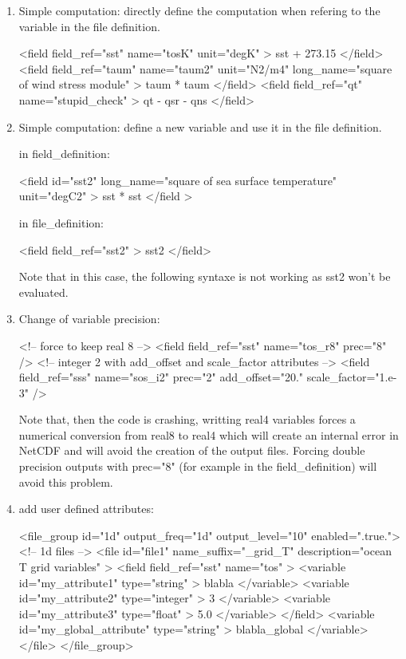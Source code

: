 \documentclass[../main/NEMO_manual]{subfiles}
\begin{document}
\begin{enumerate}
\item Simple computation: directly define the computation when refering to the variable in the file definition.

\begin{xmllines}
<field field_ref="sst"  name="tosK"  unit="degK" > sst + 273.15 </field>
<field field_ref="taum" name="taum2" unit="N2/m4" long_name="square of wind stress module" >   taum * taum </field>
<field field_ref="qt"   name="stupid_check" > qt - qsr - qns </field>
\end{xmllines}

\item Simple computation: define a new variable and use it in the file definition.

in field\_definition:

\begin{xmllines}
<field id="sst2" long_name="square of sea surface temperature" unit="degC2" >  sst * sst </field >
\end{xmllines}

in file\_definition:

\begin{xmllines}
<field field_ref="sst2" > sst2 </field>
\end{xmllines}

Note that in this case, the following syntaxe  is not working as
sst2 won't be evaluated.

\item Change of variable precision:

\begin{xmllines}
<!-- force to keep real 8 -->
<field field_ref="sst" name="tos_r8" prec="8" />
<!-- integer 2  with add_offset and scale_factor attributes -->
<field field_ref="sss" name="sos_i2" prec="2" add_offset="20." scale_factor="1.e-3" />
\end{xmllines}

Note that, then the code is crashing, writting real4 variables forces a numerical conversion from
real8 to real4 which will create an internal error in NetCDF and will avoid the creation of the output files.
Forcing double precision outputs with prec="8" (for example in the field\_definition) will avoid this problem.

\item add user defined attributes:

\begin{xmllines}
<file_group id="1d" output_freq="1d" output_level="10" enabled=".true."> <!-- 1d files -->
   <file id="file1" name_suffix="_grid_T" description="ocean T grid variables" >
      <field field_ref="sst" name="tos" >
         <variable id="my_attribute1" type="string"  > blabla </variable>
         <variable id="my_attribute2" type="integer" > 3      </variable>
         <variable id="my_attribute3" type="float"   > 5.0    </variable>
      </field>
      <variable id="my_global_attribute" type="string" > blabla_global </variable>
   </file>
</file_group>
\end{xmllines}


\end{enumerate}
\end{document}
